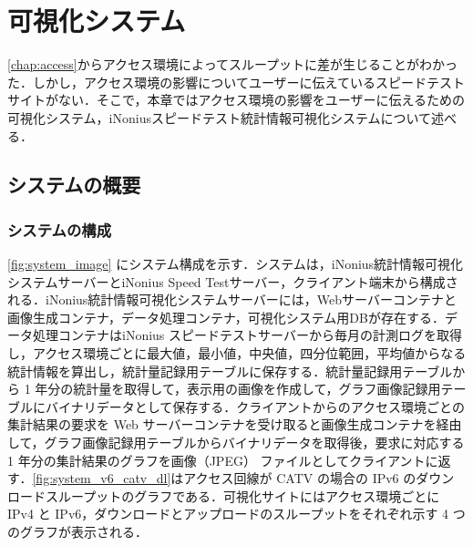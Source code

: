 \chapter{可視化システム}
\label{chap:system}
\cref{chap:access}からアクセス環境によってスループットに差が生じることがわかった．しかし，アクセス環境の影響についてユーザーに伝えているスピードテストサイトがない．そこで，本章ではアクセス環境の影響をユーザーに伝えるための可視化システム，iNoniusスピードテスト統計情報可視化システムについて述べる．

\section{システムの概要}
\subsection{システムの構成}
\cref{fig:system_image} にシステム構成を示す．システムは，iNonius統計情報可視化システムサーバーとiNonius Speed Testサーバー，クライアント端末から構成される．iNonius統計情報可視化システムサーバーには，Webサーバーコンテナと画像生成コンテナ，データ処理コンテナ，可視化システム用DBが存在する．データ処理コンテナはiNonius スピードテストサーバーから毎月の計測ログを取得し，アクセス環境ごとに最大値，最小値，中央値，四分位範囲，平均値からなる統計情報を算出し，統計量記録用テーブルに保存する．統計量記録用テーブルから 1 年分の統計量を取得して，表示用の画像を作成して，グラフ画像記録用テーブルにバイナリデータとして保存する．クライアントからのアクセス環境ごとの集計結果の要求を Web サーバーコンテナを受け取ると画像生成コンテナを経由して，グラフ画像記録用テーブルからバイナリデータを取得後，要求に対応する 1 年分の集計結果のグラフを画像（JPEG） ファイルとしてクライアントに返す．\cref{fig:system_v6_catv_dl}はアクセス回線が CATV の場合の IPv6 のダウンロードスループットのグラフである．可視化サイトにはアクセス環境ごとに IPv4 と IPv6，ダウンロードとアップロードのスループットをそれぞれ示す 4 つのグラフが表示される．

